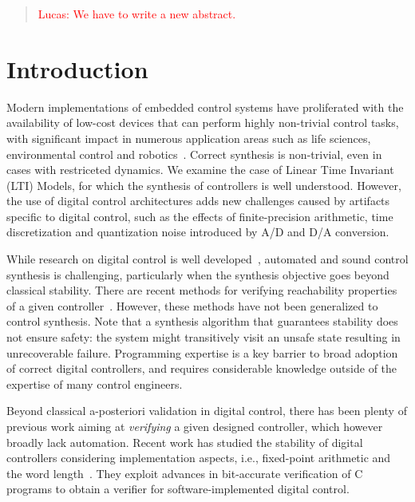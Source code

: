 \documentclass[twocolumn]{autart}    %
\begin{document}
\begin{frontmatter}


\begin{abstract}                          %
\textcolor{red}{Lucas: We have to write a new abstract.}
\end{abstract}

\end{frontmatter}

\section{Introduction}

Modern implementations of embedded control systems have proliferated with
the availability of low-cost devices that can perform highly non-trivial
control tasks, with significant impact in numerous application areas such as
life sciences, environmental control and robotics~\cite{astrom1997computer,
Franklin15}.  Correct synthesis is non-trivial, even in cases with
restriceted dynamics.  We examine the case of Linear Time Invariant (LTI)
Models, for which the synthesis of controllers is well understood.  However,
the use of digital control architectures adds new challenges caused by
artifacts specific to digital control, such as the effects of
finite-precision arithmetic, time discretization and quantization noise
introduced by A/D and D/A conversion.

While research on digital control is well developed~\cite{astrom1997computer},
automated and sound control synthesis is challenging, particularly when the
synthesis objective goes beyond classical stability.  There are recent methods
for verifying reachability properties of a given controller~\cite{FLD+11}.
However, these methods have not been generalized to control synthesis.  
Note that a synthesis algorithm that guarantees stability does not
ensure safety: the system might transitively visit an unsafe state resulting
in unrecoverable failure. Programming expertise is a key
barrier to broad adoption of correct digital controllers, and requires
considerable knowledge outside of the expertise of many control engineers.

Beyond classical a-posteriori validation in digital control, there has been
plenty of previous work aiming at \emph{verifying} a given designed
controller, which however broadly lack automation.  Recent work has studied
the stability of digital controllers considering implementation aspects,
i.e., fixed-point arithmetic and the word length~\cite{Bessa16}.  They
exploit advances in bit-accurate verification of C programs to obtain a
verifier for software-implemented digital control.
\end{document}
